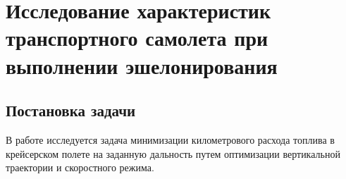 \section{Исследование характеристик транспортного самолета при выполнении эшелонирования}
\subsection{Постановка задачи}
В работе исследуется задача минимизации километрового расхода топлива в
крейсерском полете на заданную дальность путем оптимизации вертикальной
траектории и скоростного режима.
